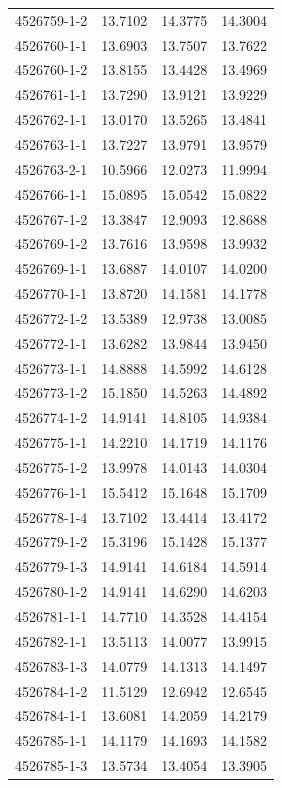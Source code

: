 \begin{longtable}{lrrr}
4526759-1-2 & 13.7102 & 14.3775 & 14.3004 \\
4526760-1-1 & 13.6903 & 13.7507 & 13.7622 \\
4526760-1-2 & 13.8155 & 13.4428 & 13.4969 \\
4526761-1-1 & 13.7290 & 13.9121 & 13.9229 \\
4526762-1-1 & 13.0170 & 13.5265 & 13.4841 \\
4526763-1-1 & 13.7227 & 13.9791 & 13.9579 \\
4526763-2-1 & 10.5966 & 12.0273 & 11.9994 \\
4526766-1-1 & 15.0895 & 15.0542 & 15.0822 \\
4526767-1-2 & 13.3847 & 12.9093 & 12.8688 \\
4526769-1-2 & 13.7616 & 13.9598 & 13.9932 \\
4526769-1-1 & 13.6887 & 14.0107 & 14.0200 \\
4526770-1-1 & 13.8720 & 14.1581 & 14.1778 \\
4526772-1-2 & 13.5389 & 12.9738 & 13.0085 \\
4526772-1-1 & 13.6282 & 13.9844 & 13.9450 \\
4526773-1-1 & 14.8888 & 14.5992 & 14.6128 \\
4526773-1-2 & 15.1850 & 14.5263 & 14.4892 \\
4526774-1-2 & 14.9141 & 14.8105 & 14.9384 \\
4526775-1-1 & 14.2210 & 14.1719 & 14.1176 \\
4526775-1-2 & 13.9978 & 14.0143 & 14.0304 \\
4526776-1-1 & 15.5412 & 15.1648 & 15.1709 \\
4526778-1-4 & 13.7102 & 13.4414 & 13.4172 \\
4526779-1-2 & 15.3196 & 15.1428 & 15.1377 \\
4526779-1-3 & 14.9141 & 14.6184 & 14.5914 \\
4526780-1-2 & 14.9141 & 14.6290 & 14.6203 \\
4526781-1-1 & 14.7710 & 14.3528 & 14.4154 \\
4526782-1-1 & 13.5113 & 14.0077 & 13.9915 \\
4526783-1-3 & 14.0779 & 14.1313 & 14.1497 \\
4526784-1-2 & 11.5129 & 12.6942 & 12.6545 \\
4526784-1-1 & 13.6081 & 14.2059 & 14.2179 \\
4526785-1-1 & 14.1179 & 14.1693 & 14.1582 \\
4526785-1-3 & 13.5734 & 13.4054 & 13.3905 \\

\end{longtable}
